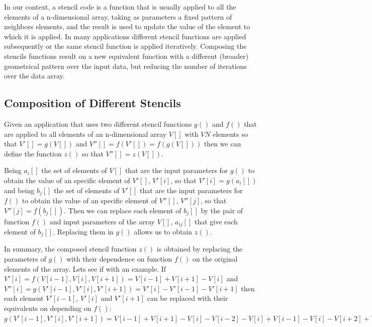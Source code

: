 \documentclass{acm_proc_article-sp}
\begin{document}
In our context, a stencil code is a function that is usually applied to all the elements of a n-dimensional array, taking as parameters a fixed pattern of neighbors elements, and the result is used to update the value of the element to which it is applied. In many applications different stencil functions are applied subsequently or the same stencil function is applied iteratively.
Composing the stencils functions result on a new equivalent function with a different (broader) geometrical pattern over the input data, but reducing the number of iterations over the data array.


\subsection{Composition of Different Stencils}
Given an application that uses two different stencil functions $g()$ and $f()$ that are applied to all elements of an n-dimensional array $V[]$ with $VN$ elements so that $V'[] = g(V[])$ and $V''[] = f(V'[]) = f(g(V[]))$ then we can define the function $z()$ so that $V''[] = z(V[])$.

Being $a_i[]$ the set of elements of $V[]$ that are the input parameters for $g()$ to obtain the value of an specific element of $V'[]$, $V'[i]$, so that $V'[i] = g(a_i[])$ and being $b_j[]$ the set of elements of $V'[]$ that are the input parameters for $f()$ to obtain the value of an specific element of $V''[]$, $V''[j]$, so that $V''[j] = f(b_j[])$. Then we can replace each element of $b_j[]$ by the pair of function $f()$ and input parameters of the array $V[]$, $a_{ij}[]$ that give each element of $b_j[]$. Replacing them in $g()$ allows us to obtain $z()$.

In summary, the composed stencil function $z()$ is obtained by replacing the parameters of $g()$ with their dependence on function $f()$ on the original elements of the array. Lets see if with an example. If\\
$V'[i] = f(V[i-1], V[i], V[i+1]) = V[i-1] + V[i+1] - V[i]$ and \\
$V''[i] = g(V'[i-1], V'[i], V'[i+1]) = V'[i] - V'[i-1] - V'[i+1]$
then each element $V'[i-1]$, $V'[i]$ and $V'[i+1]$ can be replaced with their equivalents on depending on $f()$:
$g(V'[i-1], V'[i], V'[i+1]) = V[i-1] + V[i+1] - V[i] - V[i-2] - V[i] + V[i-1]  -V[i] - V[i+2] + V[i+1] = z(V[i-2], V[i-1], V[i], V[i+1], V[i+2])$




\end{document}
